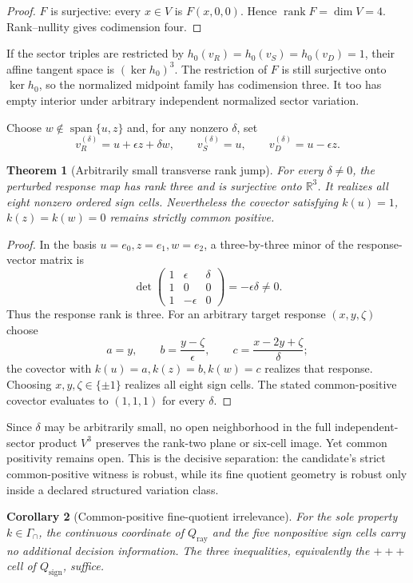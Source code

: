 \documentclass[11pt]{article}
\newtheorem{theorem}{Theorem}
\newtheorem{corollary}[theorem]{Corollary}
\newcommand{\RR}{\mathbb R}
\newcommand{\Qray}{Q_{\mathrm{ray}}}
\newcommand{\Qsign}{Q_{\mathrm{sign}}}
\begin{document}
\begin{proof}
$F$ is surjective: every $x\in V$ is $F(x,0,0)$.  Hence
$\operatorname{rank}F=\dim V=4$.  Rank--nullity gives codimension four.
\end{proof}

If the sector triples are restricted by
$h_0(v_R)=h_0(v_S)=h_0(v_D)=1$, their affine tangent space is
$(\ker h_0)^3$.  The restriction of $F$ is still surjective onto
$\ker h_0$, so the normalized midpoint family has codimension three.  It too
has empty interior under arbitrary independent normalized sector variation.

Choose $w\notin\operatorname{span}\{u,z\}$ and, for any nonzero $\delta$, set
\[
 v_R^{(\delta)}=u+\epsilon z+\delta w,\qquad
 v_S^{(\delta)}=u,\qquad
 v_D^{(\delta)}=u-\epsilon z.
\]

\begin{theorem}[Arbitrarily small transverse rank jump]
For every $\delta\ne0$, the perturbed response map has rank three and is
surjective onto $\RR^3$.  It realizes all eight nonzero ordered sign cells.
Nevertheless the covector satisfying
$k(u)=1$, $k(z)=k(w)=0$ remains strictly common positive.
\end{theorem}

\begin{proof}
In the basis $u=e_0,z=e_1,w=e_2$, a three-by-three minor of the response-vector
matrix is
\[
 \det\begin{pmatrix}
 1&\epsilon&\delta\\
 1&0&0\\
 1&-\epsilon&0
 \end{pmatrix}=-\epsilon\delta\ne0.
\]
Thus the response rank is three.  For an arbitrary target response
$(x,y,\zeta)$ choose
\[
 a=y,\qquad b=\frac{y-\zeta}{\epsilon},\qquad
 c=\frac{x-2y+\zeta}{\delta};
\]
the covector with $k(u)=a,k(z)=b,k(w)=c$ realizes that response.  Choosing
$x,y,\zeta\in\{\pm1\}$ realizes all eight sign cells.  The stated
common-positive covector evaluates to $(1,1,1)$ for every $\delta$.
\end{proof}

Since $\delta$ may be arbitrarily small, no open neighborhood in the full
independent-sector product $V^3$ preserves the rank-two plane or six-cell
image.  Yet common positivity remains open.  This is the decisive separation:
the candidate's strict common-positive witness is robust, while its fine
quotient geometry is robust only inside a declared structured variation class.

\begin{corollary}[Common-positive fine-quotient irrelevance]
For the sole property $k\in\Gamma_\cap$, the continuous coordinate of $\Qray$
and the five nonpositive sign cells carry no additional decision information.
The three inequalities, equivalently the $+++$ cell of $\Qsign$, suffice.
\end{corollary}
\end{document}
